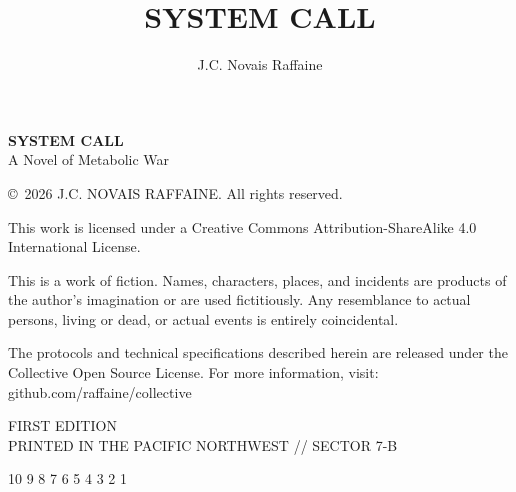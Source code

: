 \documentclass[11pt, openany]{book}
\title{\headerfont\Huge\textbf{SYSTEM CALL}}
\author{\headerfont J.C. Novais Raffaine}
\date{}
\begin{document}


\newpage
\thispagestyle{empty}
\vspace*{\fill}

\begin{flushleft}
    {\headerfont\large\textbf{SYSTEM CALL}} \\
    {\headerfont\small A Novel of Metabolic War} \\
    \vspace{2ex}
    
    {\small \copyright\ 2026 J.C. NOVAIS RAFFAINE. All rights reserved.} \\
    \vspace{2ex}
    
    {\small This work is licensed under a Creative Commons Attribution-ShareAlike 4.0 International License.} \\
    \vspace{2ex}

    {\footnotesize 
    This is a work of fiction. Names, characters, places, and incidents are products of the author's imagination or are used fictitiously. Any resemblance to actual persons, living or dead, or actual events is entirely coincidental. \\
    \vspace{1ex}
    
    The protocols and technical specifications described herein are released under the Collective Open Source License. For more information, visit: \\
    \headerfont\color{collectiveBlue} github.com/raffaine/collective
    }
    
    \vspace{4ex}
    
    {\headerfont\scriptsize FIRST EDITION} \\
    {\headerfont\scriptsize PRINTED IN THE PACIFIC NORTHWEST // SECTOR 7-B} \\
    \vspace{2ex}
    
    {\headerfont\tiny 10 9 8 7 6 5 4 3 2 1}
\end{flushleft}
\vspace{2ex}

\frontmatter
\maketitle
\tableofcontents
\end{document}
